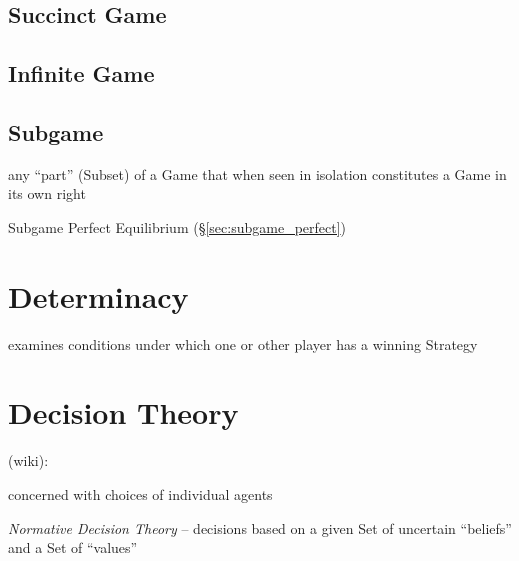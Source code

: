 \subsection{Succinct Game}\label{sec:succinct_game}

\subsection{Infinite Game}\label{sec:infinite_game}

\subsection{Subgame}\label{sec:subgame}

any ``part'' (Subset) of a Game that when seen in isolation constitutes a Game
in its own right

Subgame Perfect Equilibrium (\S\ref{sec:subgame_perfect})



\section{Determinacy}\label{sec:determinacy}

examines conditions under which one or other player has a winning Strategy



\section{Decision Theory}\label{sec:decision_theory}

(wiki):

concerned with choices of individual agents

\emph{Normative Decision Theory} -- decisions based on a given Set of uncertain
``beliefs'' and a Set of ``values''

